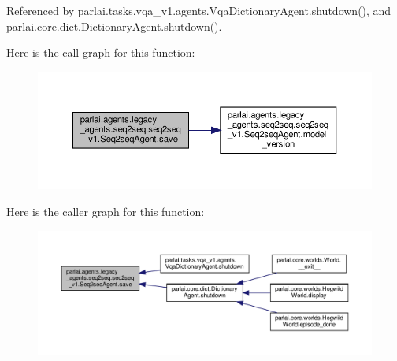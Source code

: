 Referenced by parlai.\+tasks.\+vqa\+\_\+v1.\+agents.\+Vqa\+Dictionary\+Agent.\+shutdown(), and parlai.\+core.\+dict.\+Dictionary\+Agent.\+shutdown().

Here is the call graph for this function\+:
\nopagebreak
\begin{figure}[H]
\begin{center}
\leavevmode
\includegraphics[width=350pt]{classparlai_1_1agents_1_1legacy__agents_1_1seq2seq_1_1seq2seq__v1_1_1Seq2seqAgent_a8aa6a1efae9091dc0b38af3ce4b49706_cgraph}
\end{center}
\end{figure}
Here is the caller graph for this function\+:
\nopagebreak
\begin{figure}[H]
\begin{center}
\leavevmode
\includegraphics[width=350pt]{classparlai_1_1agents_1_1legacy__agents_1_1seq2seq_1_1seq2seq__v1_1_1Seq2seqAgent_a8aa6a1efae9091dc0b38af3ce4b49706_icgraph}
\end{center}
\end{figure}
\mbox{\label{classparlai_1_1agents_1_1legacy__agents_1_1seq2seq_1_1seq2seq__v1_1_1Seq2seqAgent_afb99f50cbac1707480d1953163d91018}} 
